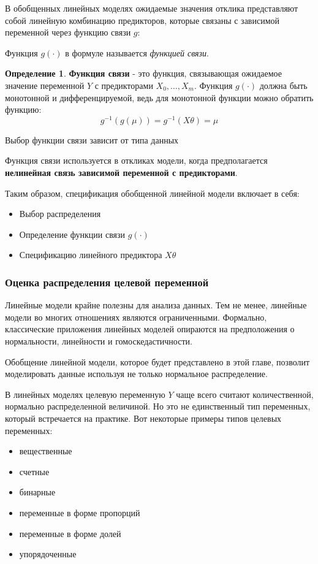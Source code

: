 \documentclass[aps,%
12pt,%
final,%
oneside,
onecolumn,%
musixtex, %
superscriptaddress,%
centertags]{article} %
\theoremstyle{plain}
\theoremstyle{definition}
\newtheorem{definition}{Определение}[subsection]
\theoremstyle{remark}
\begin{document}
В обобщенных линейных моделях ожидаемые значения отклика представляют собой линейную комбинацию предикторов, которые связаны с зависимой переменной через функцию связи $g$:

Функция $g(\cdot)$ в формуле называется \textit{функцией связи}. 

\begin{definition}
	\textbf{Функция связи} - это функция, связывающая ожидаемое значение переменной $Y$ с предикторами $X_0,\ldots,X_m$. Функция $g(\cdot)$ должна быть монотонной и дифференцируемой, ведь для монотонной функции можно обратить функцию:
	$$g^{-1}(g(\mu)) = g^{-1}(X\theta) = \mu$$

	Выбор функции связи зависит от типа данных
\end{definition}

Функция связи используется в откликах модели, когда предполагается \textbf{нелинейная связь зависимой переменной с предикторами}.

Таким образом, спецификация обобщенной линейной модели включает в себя:

\begin{itemize}
	\item Выбор распределения
	\item Определение функции связи $g(\cdot)$
	\item Спецификацию линейного предиктора $X\theta$
\end{itemize}

\subsubsection{Оценка распределения целевой переменной}

Линейные модели крайне полезны для анализа данных. Тем не менее, линейные модели во многих отношениях являются ограниченными. Формально, классические приложения линейных моделей опираются на предположения о нормальности, линейности и гомоскедастичности.

Обобщение линейной модели, которое будет представлено в этой главе, позволит моделировать данные используя не только нормальное распределение.

В линейных моделях целевую переменную $Y$ чаще всего считают количественной, нормально распределенной величиной. Но это не единственный тип переменных, который встречается на практике. Вот некоторые примеры типов целевых переменных:

\begin{itemize}
	\item вещественные
	\item счетные
	\item бинарные
	\item переменные в форме пропорций
	\item переменные в форме долей
	\item упорядоченные
\end{itemize}
\end{document}
